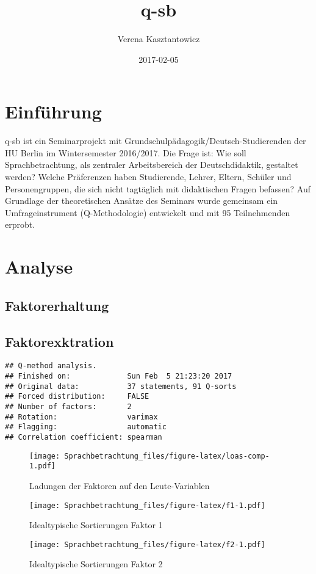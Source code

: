 \documentclass[]{book}
\title{q-sb}
\author{Verena Kasztantowicz}
\date{2017-02-05}
\begin{document}
\maketitle

{
\setcounter{tocdepth}{1}
\tableofcontents
}
\chapter{Einführung}\label{einfuhrung}

q-sb ist ein Seminarprojekt mit Grundschulpädagogik/Deutsch-Studierenden
der HU Berlin im Wintersemester 2016/2017. Die Frage ist: Wie soll
Sprachbetrachtung, als zentraler Arbeitsbereich der Deutschdidaktik,
gestaltet werden? Welche Präferenzen haben Studierende, Lehrer, Eltern,
Schüler und Personengruppen, die sich nicht tagtäglich mit didaktischen
Fragen befassen? Auf Grundlage der theoretischen Ansätze des Seminars
wurde gemeinsam ein Umfrageinstrument (Q-Methodologie) entwickelt und
mit 95 Teilnehmenden erprobt.

\chapter{Analyse}\label{analyse}

\section{Faktorerhaltung}\label{faktorerhaltung}

\section{Faktorexktration}\label{faktorexktration}

\begin{verbatim}
## Q-method analysis.
## Finished on:             Sun Feb  5 21:23:20 2017
## Original data:           37 statements, 91 Q-sorts
## Forced distribution:     FALSE
## Number of factors:       2
## Rotation:                varimax
## Flagging:                automatic
## Correlation coefficient: spearman
\end{verbatim}

\begin{figure}[htbp]
\centering
\texttt{[image: Sprachbetrachtung\_files/figure-latex/loas-comp-1.pdf]}
\caption{\label{fig:loas-comp}Ladungen der Faktoren auf den Leute-Variablen}
\end{figure}

\begin{figure}[htbp]
\centering
\texttt{[image: Sprachbetrachtung\_files/figure-latex/f1-1.pdf]}
\caption{\label{fig:f1}Idealtypische Sortierungen Faktor 1}
\end{figure}

\begin{figure}[htbp]
\centering
\texttt{[image: Sprachbetrachtung\_files/figure-latex/f2-1.pdf]}
\caption{\label{fig:f2}Idealtypische Sortierungen Faktor 2}
\end{figure}
\end{document}
